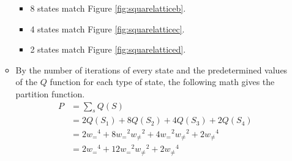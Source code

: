 \documentclass[titlepage]{article}
\numberwithin{figure}{section}
\numberwithin{table}{section}
\numberwithin{equation}{section}
\begin{document}
\begin{itemize}
\begin{itemize}
\begin{itemize}
            \item 8 states match Figure \ref{fig:squarelatticeb}.
            \item 4 states match Figure \ref{fig:squarelatticec}.
            \item 2 states match Figure \ref{fig:squarelatticed}.
        \end{itemize}
        \item By the number of iterations of every state and the predetermined values of the $Q$ function for each type of state, the following math gives the partition function.
        \begin{align*}
            P &= \sum_s Q(S)\\
            &= 2Q(S_1)+8Q(S_2)+4Q(S_3)+2Q(S_4)\\
            &= 2{w_=}^4+8{w_=}^2{w_{\neq}}^2+4{w_=}^2{w_{\neq}}^2+2{w_{\neq}}^4\\
            &= 2{w_=}^4+12{w_=}^2{w_{\neq}}^2+2{w_{\neq}}^4
        \end{align*}
    \end{itemize}
\end{itemize}
\end{document}
